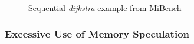 \lstset{basicstyle=\ttfamily, numbers=left, numberstyle=\tiny,
  stepnumber=1, numbersep=5pt}
\begin{figure}[t]
  \centering
  \scriptsize
    \subfloat{
    \begin{minipage}{5cm}
      
    \end{minipage}
%
%
%
%
%
%

}
\caption{Sequential \textit{dijkstra} example from MiBench~\cite{}}
\label{fig:dijkstra_motivation}
\end{figure}


\subsubsection{Excessive Use of Memory Speculation}

